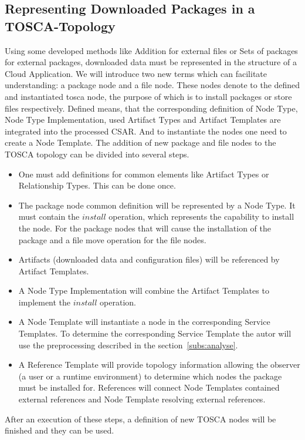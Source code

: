 \subsection{Representing Downloaded Packages in a TOSCA-Topology} \label{subs:repres}
Using some developed methods like Addition for external files or Sets of packages for external packages, downloaded data must be represented in the structure of a Cloud Application.
We will introduce two new terms which can facilitate understanding: a package node and a file node.
These nodes denote to the defined and instantiated \gls{tosca} node, the purpose of which is to install packages or store files respectively.
Defined means, that the corresponding definition of Node Type, Node Type Implementation, used Artifact Types and Artifact Templates are integrated into the processed CSAR.
And to instantiate the nodes one need to create a Node Template.
The addition of new package and file nodes to the TOSCA topology can be divided into several steps.
\begin{itemize}
	\item One must add definitions for common elements like Artifact Types or Relationship Types. 
		This can be done once.
	\item The package node common definition will be represented by a Node Type.   
		It must contain the $install$ operation, which represents the capability to install the node.
		For the package nodes that will cause the installation of the package and a file move operation for the file nodes.
	\item Artifacts (downloaded data and configuration files) will be referenced by Artifact Templates.
	\item A Node Type Implementation will combine the Artifact Templates to implement the $install$ operation.
	\item A Node Template will instantiate a node in the corresponding Service Templates.
		To determine the corresponding Service Template the autor will use the preprocessing described in the section~\ref{subs:analyse}.
	\item A Reference Template will provide topology information allowing the observer (a user or a runtime environment) to determine which nodes the package must be installed for.
		References will connect Node Templates contained external references and Node Template resolving external references.
\end{itemize}
After an execution of these steps, a definition of new TOSCA nodes will be finished and they can be used.

